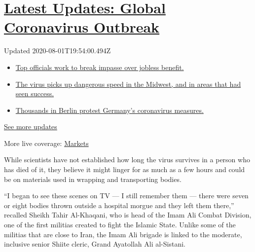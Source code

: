 \hypertarget{latest-updates-global-coronavirus-outbreak}{%
\section{\texorpdfstring{\href{https://www.nytimes3xbfgragh.onion/2020/08/01/world/coronavirus-covid-19.html?action=click\&pgtype=Article\&state=default\&region=MAIN_CONTENT_1\&context=storylines_live_updates}{Latest
Updates: Global Coronavirus
Outbreak}}{Latest Updates: Global Coronavirus Outbreak}}\label{latest-updates-global-coronavirus-outbreak}}

Updated 2020-08-01T19:54:00.494Z

\begin{itemize}
\tightlist
\item
  \href{https://www.nytimes3xbfgragh.onion/2020/08/01/world/coronavirus-covid-19.html?action=click\&pgtype=Article\&state=default\&region=MAIN_CONTENT_1\&context=storylines_live_updates\#link-3ac56579}{Top
  officials work to break impasse over jobless benefit.}
\item
  \href{https://www.nytimes3xbfgragh.onion/2020/08/01/world/coronavirus-covid-19.html?action=click\&pgtype=Article\&state=default\&region=MAIN_CONTENT_1\&context=storylines_live_updates\#link-8796723}{The
  virus picks up dangerous speed in the Midwest, and in areas that had
  seen success.}
\item
  \href{https://www.nytimes3xbfgragh.onion/2020/08/01/world/coronavirus-covid-19.html?action=click\&pgtype=Article\&state=default\&region=MAIN_CONTENT_1\&context=storylines_live_updates\#link-25930521}{Thousands
  in Berlin protest Germany's coronavirus measures.}
\end{itemize}

\href{https://www.nytimes3xbfgragh.onion/2020/08/01/world/coronavirus-covid-19.html?action=click\&pgtype=Article\&state=default\&region=MAIN_CONTENT_1\&context=storylines_live_updates}{See
more updates}

More live coverage:
\href{https://www.nytimes3xbfgragh.onion/live/2020/07/31/business/stock-market-today-coronavirus?action=click\&pgtype=Article\&state=default\&region=MAIN_CONTENT_1\&context=storylines_live_updates}{Markets}

While scientists have not established how long the virus survives in a
person who has died of it, they believe it might linger for as much as a
few hours and could be on materials used in wrapping and transporting
bodies.

``I began to see these scenes on TV --- I still remember them --- there
were seven or eight bodies thrown outside a hospital morgue and they
left them there,'' recalled Sheikh Tahir Al-Khaqani, who is head of the
Imam Ali Combat Division, one of the first militias created to fight the
Islamic State. Unlike some of the militias that are close to Iran, the
Imam Ali brigade is linked to the moderate, inclusive senior Shiite
cleric, Grand Ayatollah Ali al-Sistani.

